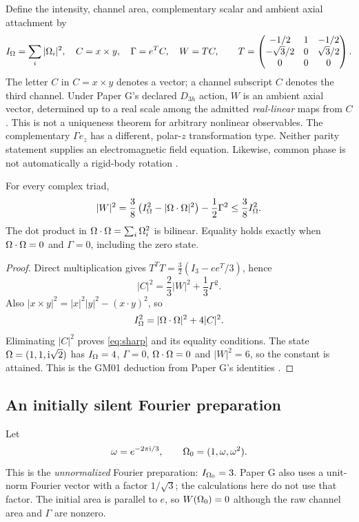 Define the intensity, channel area, complementary scalar and ambient axial attachment by
\begin{equation}
 I_\Omega=\sum_i|\Omega_i|^2,\quad C=x\times y,\quad \Gamma=e^TC,\quad
 W=TC,\qquad
 T=\begin{pmatrix}
 -1/2&1&-1/2\\
 -\sqrt3/2&0&\sqrt3/2\\
 0&0&0
 \end{pmatrix}.
 \label{eq:attachment}
\end{equation}
The letter \(C\) in \(C=x\times y\) denotes a vector; a channel subscript \(C\) denotes the third channel. Under Paper G's declared \(D_{3h}\) action, \(W\) is an ambient axial vector, determined up to a real scale among the admitted \emph{real-linear} maps from \(C\). This is not a uniqueness theorem for arbitrary nonlinear observables. The complementary \(\Gamma e_z\) has a different, polar-\(z\) transformation type. Neither parity statement supplies an electromagnetic field equation. Likewise, common phase is not automatically a rigid-body rotation \cite{G,PHASE}.

\begin{proposition}\label{prop:bound}
For every complex triad,
\begin{equation}
 |W|^2=\frac38\left(I_\Omega^2-|\Omega\cdot\Omega|^2\right)-\frac12\Gamma^2
 \le \frac38 I_\Omega^2. \label{eq:sharp}
\end{equation}
The dot product in \(\Omega\cdot\Omega=\sum_i\Omega_i^2\) is bilinear. Equality holds exactly when \(\Omega\cdot\Omega=0\) and \(\Gamma=0\), including the zero state.
\end{proposition}
\begin{proof}
Direct multiplication gives \(T^TT=\frac32(I_3-ee^T/3)\), hence
\[
 |C|^2=\frac23|W|^2+\frac13\Gamma^2.
\]
Also \(|x\times y|^2=|x|^2|y|^2-(x\cdot y)^2\), so
\[
 I_\Omega^2=|\Omega\cdot\Omega|^2+4|C|^2.
\]
Eliminating \(|C|^2\) proves \eqref{eq:sharp} and its equality conditions. The state \(\Omega=(1,1,\mathrm i\sqrt2)\) has \(I_\Omega=4\), \(\Gamma=0\), \(\Omega\cdot\Omega=0\) and \(|W|^2=6\), so the constant is attained. This is the GM01 deduction from Paper G's identities \cite{GM01,G}.
\end{proof}

\subsection{An initially silent Fourier preparation}
Let
\begin{equation}
 \omega=e^{-2\pi\mathrm i/3},\qquad \Omega_0=(1,\omega,\omega^2).
 \label{eq:fourier}
\end{equation}
This is the \emph{unnormalized} Fourier preparation: \(I_{\Omega_0}=3\). Paper G also uses a unit-norm Fourier vector with a factor \(1/\sqrt3\); the calculations here do not use that factor. The initial area is parallel to \(e\), so \(W(\Omega_0)=0\) although the raw channel area and \(\Gamma\) are nonzero.

